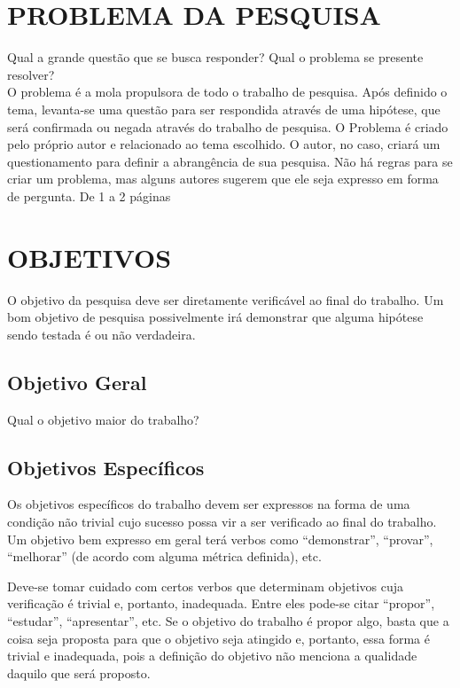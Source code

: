 \documentclass[
    12pt,				       %
    openright,			       %
    oneside,			       %
    a4paper,			       %
    chapter=TITLE,             %
    sumario=tradicional,       %
    english,			        %
    brazil, 				    %
 ]{abntex2}
\begin{document}
\section{\MakeUppercase{Problema da Pesquisa}}\label{sec:ProbPesq}

Qual a grande questão que se busca responder? Qual o problema se presente resolver? \\
O problema é a mola propulsora de todo o trabalho de pesquisa. Após definido o tema, levanta-se uma questão para ser respondida através de uma hipótese, que será confirmada ou negada através do trabalho de pesquisa. O Problema é criado pelo próprio autor e relacionado ao tema escolhido. O autor, no caso, criará um questionamento para definir a abrangência de sua pesquisa. Não há regras para se criar um problema, mas alguns autores sugerem que ele seja expresso em forma de pergunta.
De 1 a 2 páginas

\section{\MakeUppercase{Objetivos}}\label{sec:objetivos}

O objetivo da pesquisa deve ser diretamente verificável ao final do trabalho. Um bom objetivo de pesquisa possivelmente irá demonstrar que alguma hipótese sendo testada é ou não verdadeira.


\subsection{Objetivo Geral}\label{sec:ObjGeral}

Qual o objetivo maior do trabalho?

\subsection{Objetivos Específicos}\label{sec:ObjEspec}

Os objetivos específicos do trabalho devem ser expressos na forma de uma condição não trivial cujo sucesso possa vir a ser verificado ao final do trabalho. Um objetivo bem expresso em geral terá verbos como “demonstrar”, “provar”, “melhorar” (de acordo com alguma métrica definida), etc.

Deve-se tomar cuidado com certos verbos que determinam objetivos cuja verificação é trivial e, portanto, inadequada. Entre eles pode-se citar “propor”, “estudar”, “apresentar”, etc. Se o objetivo do trabalho é propor algo, basta que a coisa seja proposta para que o objetivo seja atingido e, portanto, essa forma é trivial e inadequada, pois a definição do objetivo não menciona a qualidade daquilo que será proposto.
\end{document}
